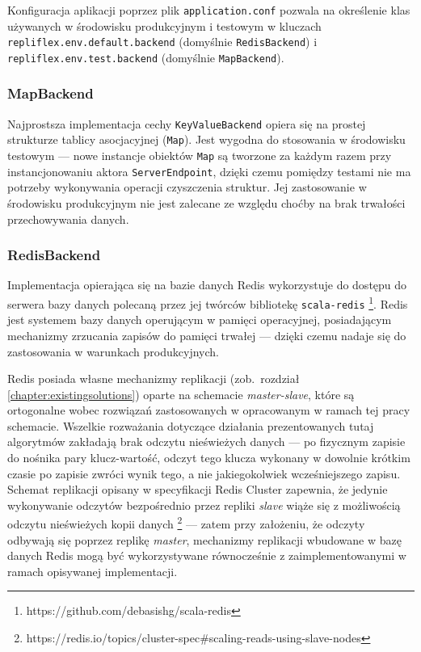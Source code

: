 Konfiguracja aplikacji poprzez plik \texttt{application.conf} pozwala na określenie klas używanych w środowisku produkcyjnym i testowym w kluczach \texttt{repliflex.env.default.backend} (domyślnie \texttt{RedisBackend}) i \texttt{repliflex.env.test.backend} (domyślnie \texttt{MapBackend}).

\subsubsection{MapBackend} \label{mapbackend}

Najprostsza implementacja cechy \texttt{KeyValueBackend} opiera się na prostej strukturze tablicy asocjacyjnej (\texttt{Map}). Jest wygodna do stosowania w środowisku testowym --- nowe instancje obiektów \texttt{Map} są tworzone za każdym razem przy instancjonowaniu aktora \texttt{ServerEndpoint}, dzięki czemu pomiędzy testami nie ma potrzeby wykonywania operacji czyszczenia struktur. Jej zastosowanie w środowisku produkcyjnym nie jest zalecane ze względu choćby na brak trwałości przechowywania danych.

\subsubsection{RedisBackend} \label{redisbackend}

Implementacja opierająca się na bazie danych Redis wykorzystuje do dostępu do serwera bazy danych polecaną przez jej twórców bibliotekę \texttt{scala-redis} \footnote{https://github.com/debasishg/scala-redis}. Redis jest systemem bazy danych operującym w pamięci operacyjnej, posiadającym mechanizmy zrzucania zapisów do pamięci trwałej --- dzięki czemu nadaje się do zastosowania w warunkach produkcyjnych.

Redis posiada własne mechanizmy replikacji (zob.\ rozdział \ref{chapter:existingsolutions}) oparte na schemacie \textit{master-slave}, które są ortogonalne wobec rozwiązań zastosowanych w opracowanym w ramach tej pracy schemacie. Wszelkie rozważania dotyczące działania prezentowanych tutaj algorytmów zakładają brak odczytu nieświeżych danych --- po fizycznym zapisie do nośnika pary klucz-wartość, odczyt tego klucza wykonany w dowolnie krótkim czasie po zapisie zwróci wynik tego, a nie jakiegokolwiek wcześniejszego zapisu. Schemat replikacji opisany w specyfikacji Redis Cluster zapewnia, że jedynie wykonywanie odczytów bezpośrednio przez repliki \textit{slave} wiąże się z możliwością odczytu nieświeżych kopii danych \footnote{https://redis.io/topics/cluster-spec\#scaling-reads-using-slave-nodes} --- zatem przy założeniu, że odczyty odbywają się poprzez replikę \textit{master}, mechanizmy replikacji wbudowane w bazę danych Redis mogą być wykorzystywane równocześnie z zaimplementowanymi w ramach opisywanej implementacji.

